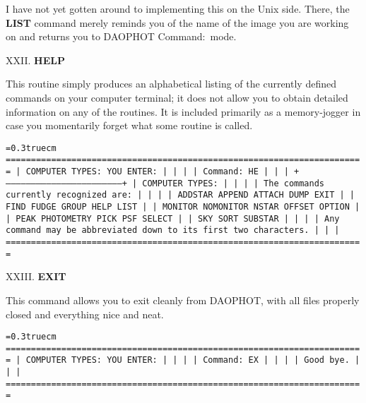 I have not yet gotten around to implementing this on the Unix side.
There, the {\bf LIST} command merely reminds you of the name of the
image you are working on and returns you to DAOPHOT Command:\ mode.

\vfill
\eject
\noindent XXII.  {\bf HELP}

This routine simply produces an alphabetical listing of the currently
defined commands on your computer terminal; it does not allow you to
obtain detailed information on any of the routines.  It is included
primarily as a memory-jogger in case you momentarily forget what some
routine is called.

\bigskip
{\noindent\obeylines\obeyspaces\frenchspacing\tt\baselineskip=0.3truecm
=======================================================================
| COMPUTER TYPES:                                  YOU ENTER:         |
|                                                                     |
| Command:                                         HE                 |
|                                                                     |
+---------------------------------------------------------------------+
| COMPUTER TYPES:                                                     |
|                                                                     |
| The commands currently recognized are:                              |
|                                                                     |
|     ADDSTAR      APPEND       ATTACH       DUMP         EXIT        |
|     FIND         FUDGE        GROUP        HELP         LIST        |
|     MONITOR      NOMONITOR    NSTAR        OFFSET       OPTION      |
|     PEAK         PHOTOMETRY   PICK         PSF          SELECT      |
|     SKY          SORT         SUBSTAR                               |
|                                                                     |
| Any command may be abbreviated down to its first two characters.    |
|                                                                     |
=======================================================================
}

\vfill
\eject
\noindent XXIII.  {\bf EXIT}

This command allows you to exit cleanly from DAOPHOT, with all
files properly closed and everything nice and neat.

\bigskip
{\noindent\obeylines\obeyspaces\frenchspacing\tt\baselineskip=0.3truecm
=======================================================================
| COMPUTER TYPES:                                      YOU ENTER:     |
|                                                                     |
| Command:                                             EX             |
|                                                                     |
| Good bye.                                                           |
|                                                                     |
=======================================================================
}

